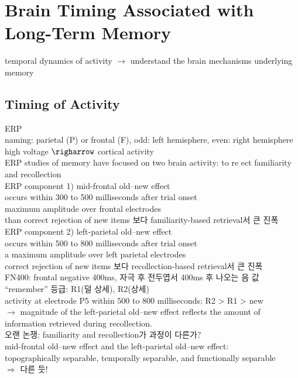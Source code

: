 \documentclass[../note.tex]{subfiles}
\begin{document}
\chapter{Brain Timing Associated with Long-Term Memory}

temporal dynamics of activity $\rightarrow$ understand the brain mechanisms underlying memory

\section{Timing of Activity}
ERP\\
naming: parietal (P) or frontal (F), odd: left hemisphere, even: right hemisphere\\
high voltage $\righarrow$ cortical activity\\

ERP studies of memory have focused on two brain activity: to re ect familiarity and recollection\\

ERP component 1) mid-frontal old–new effect\\
  occurs within 300 to 500 milliseconds after trial onset\\
  maximum amplitude over frontal electrodes\\
  than correct rejection of
new items 보다 familiarity-based retrieval서 큰 진폭\\

ERP component 2) left-parietal old–new effect\\
occurs within 500 to 800 milliseconds after trial
onset \\
a maximum amplitude over left parietal electrodes\\
correct rejection of new
items 보다 recollection-based retrieval서 큰 진폭\\


FN400: frontal negative 400ms, 자극 후 전두엽서 400ms 후 나오는 음 값\\

``remember'' 등급: R1(덜 상세), R2(상세)\\
activity at electrode P5 within 500 to 800 milliseconds: R2 > R1 > new\\
$\rightarrow$ magnitude of the left-parietal old–new effect reflects the amount of information retrieved during recollection.\\

오랜 논쟁: familiarity and recollection가 과정이 다른가?\\
mid-frontal old–new effect and the left-parietal old–new effect:\\
topographically separable, temporally separable, and functionally separable\\
$\Longrightarrow$ 다른 듯!\\
\end{document}
